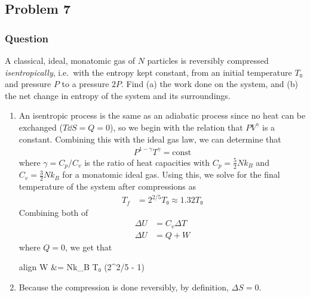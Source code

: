 \clearpage
\subsection{Problem 7}
\subsubsection{Question}

A classical, ideal, monatomic gas of $N$ particles is reversibly compressed
\emph{isentropically}, i.e.~with the entropy kept constant, from an initial
temperature $T₀$ and pressure $P$ to a pressure $2P$. Find (a) the work done
on the system, and (b) the net change in entropy of the system and its
surroundings.

\begin{enumerate}
	\item
		An isentropic process is the same as an adiabatic process since no
		heat can be exchanged ($T\dd S = Q = 0$), so we begin with the relation
		that $PV^{γ}$ is a constant. Combining this with the ideal gas law,
		we can determine that
		\begin{align*}
			P^{1-γ}T^{γ} = \mathrm{const}
		\end{align*}
		where $γ = C_p/C_v$ is the ratio of heat capacities with $C_p =
		\frac 52 Nk_B$ and $C_v = \frac 32 Nk_B$ for a monatomic ideal gas.
		Using this, we solve for the final temperature of the system after
		compressions as
		\begin{align*}
			T_f &= 2^{2/5} T₀ ≈ 1.32T₀
		\end{align*}
		Combining both of
		\begin{align*}
			ΔU &= C_v ΔT \\
			ΔU &= Q + W
		\end{align*}
		where $Q = 0$, we get that
		\begin{empheq}[box=\fbox]{align}
			W &=  Nk_B T₀ (2^{2/5} - 1)
		\end{empheq}
	\item
		Because the compression is done reversibly, by definition, $ΔS = 0$.
\end{enumerate}

\clearpage
